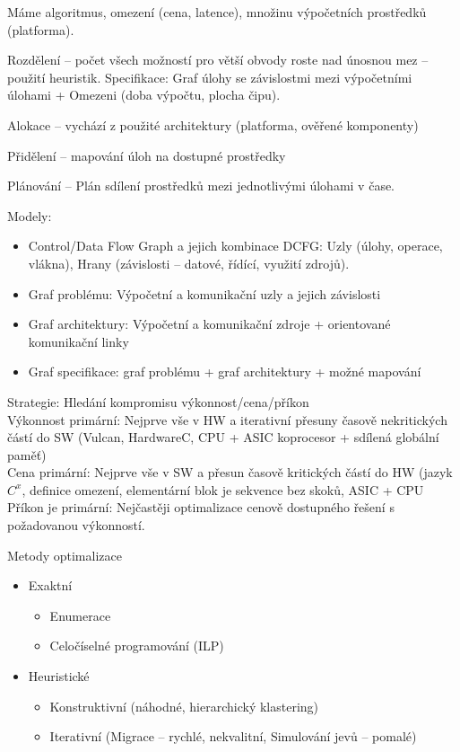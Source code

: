 \documentclass[a4paper, 11pt]{report}
\begin{document}
Máme algoritmus, omezení (cena, latence), množinu výpočetních prostředků (platforma).

Rozdělení -- počet všech možností pro větší obvody roste nad únosnou mez -- použití heuristik. Specifikace: Graf úlohy se závislostmi mezi výpočetními úlohami + Omezeni (doba výpočtu, plocha čipu).

Alokace -- vychází z použité architektury (platforma, ověřené komponenty)

Přidělení -- mapování úloh na dostupné prostředky

Plánování -- Plán sdílení prostředků mezi jednotlivými úlohami v čase.

Modely:
\begin{itemize}
	\item Control/Data Flow Graph a jejich kombinace DCFG: Uzly (úlohy, operace, vlákna), Hrany (závislosti -- datové, řídící, využití zdrojů).
	\item Graf problému: Výpočetní a komunikační uzly a jejich závislosti
	\item Graf architektury: Výpočetní a komunikační zdroje + orientované komunikační linky
	\item Graf specifikace: graf problému + graf architektury + možné mapování
\end{itemize}

Strategie: Hledání kompromisu výkonnost/cena/příkon\\
Výkonnost primární: Nejprve vše v HW a iterativní přesuny časově nekritických částí do SW (Vulcan, HardwareC, CPU + ASIC koprocesor + sdílená globální paměť)\\
Cena primární: Nejprve vše v SW a přesun časově kritických částí do HW (jazyk $C^x$, definice omezení, elementární blok je sekvence bez skoků, ASIC + CPU \\
Příkon je primární: Nejčastěji optimalizace cenově dostupného řešení s požadovanou výkonností.

Metody optimalizace
\begin{itemize}
	\item Exaktní
	\begin{itemize}
		\item Enumerace
		\item Celočíselné programování (ILP)
	\end{itemize}
	\item Heuristické
	\begin{itemize}
		\item Konstruktivní (náhodné, hierarchický klastering)
		\item Iterativní (Migrace -- rychlé, nekvalitní, Simulování jevů -- pomalé)
	\end{itemize}
\end{itemize}
\end{document}

